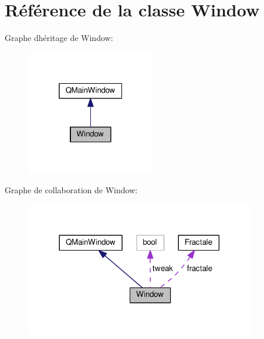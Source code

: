 \hypertarget{class_window}{}\section{Référence de la classe Window}
\label{class_window}


Graphe d\textquotesingle{}héritage de Window\+:\nopagebreak
\begin{figure}[H]
\begin{center}
\leavevmode
\includegraphics[width=160pt]{class_window__inherit__graph}
\end{center}
\end{figure}


Graphe de collaboration de Window\+:\nopagebreak
\begin{figure}[H]
\begin{center}
\leavevmode
\includegraphics[width=284pt]{class_window__coll__graph}
\end{center}
\end{figure}
